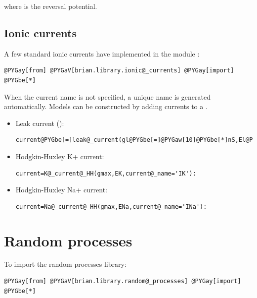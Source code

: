 \documentclass[letterpaper,10pt,english]{manual}
\begin{document}
where  is the reversal potential.


\subsection{Ionic currents}

A few standard ionic currents have implemented in the module :

\begin{Verbatim}[commandchars=@\[\]]
@PYGay[from] @PYGaV[brian.library.ionic@_currents] @PYGay[import] @PYGbe[*]
\end{Verbatim}

When the current name is not specified,
a unique name is generated automatically. Models can be constructed by adding currents to a
.
\begin{itemize}
\item {} 
Leak current ():

\begin{Verbatim}[commandchars=@\[\]]
current@PYGbe[=]leak@_current(gl@PYGbe[=]@PYGaw[10]@PYGbe[*]nS,El@PYGbe[=]@PYGbe[-]@PYGaw[70]@PYGbe[*]mV,current@_name@PYGbe[=]@PYGad[']@PYGad[I]@PYGad['])
\end{Verbatim}

\item {} 
Hodgkin-Huxley K+ current:

\begin{Verbatim}[commandchars=@\[\]]
current=K@_current@_HH(gmax,EK,current@_name='IK'):
\end{Verbatim}

\item {} 
Hodgkin-Huxley Na+ current:

\begin{Verbatim}[commandchars=@\[\]]
current=Na@_current@_HH(gmax,ENa,current@_name='INa'):
\end{Verbatim}

\end{itemize}

\resetcurrentobjects


\section{Random processes}

To import the random processes library:

\begin{Verbatim}[commandchars=@\[\]]
@PYGay[from] @PYGaV[brian.library.random@_processes] @PYGay[import] @PYGbe[*]
\end{Verbatim}
\end{document}
